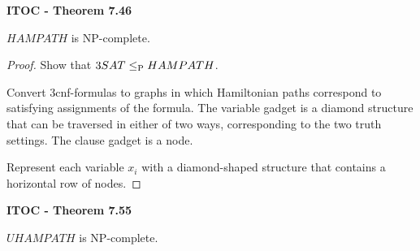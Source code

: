 \label{lang:HAMPATH_NPC}
\begin{shaded}
\textbf{ITOC - Theorem 7.46}

\medskip
$HAMPATH$ is NP-complete.
\end{shaded}

\begin{mdframed}
\begin{proof}
Show that $3SAT \leq_\P HAMPATH$.

Convert 3cnf-formulas to graphs in which Hamiltonian paths correspond to satisfying assignments of the formula. The variable gadget is a diamond structure that can be traversed in either of two ways, corresponding to the two truth settings. The clause gadget is a node.

\medskip
Represent each variable $x_i$ with a diamond-shaped structure that contains a horizontal row of nodes.
\end{proof}
\end{mdframed}

\label{lang:UHAMPATH_NPC}
\begin{shaded}
\textbf{ITOC - Theorem 7.55}

\medskip
$UHAMPATH$ is NP-complete.
\end{shaded}


